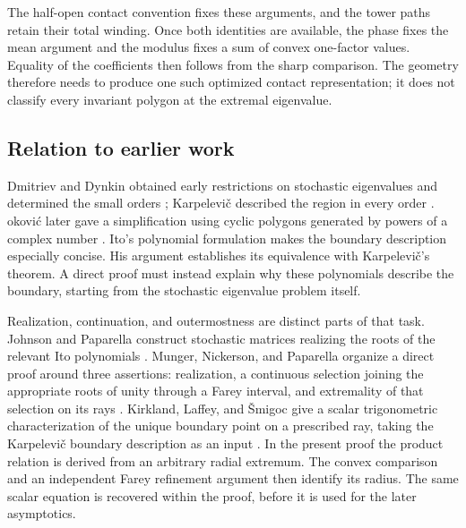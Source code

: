 \documentclass[11pt,a4paper]{article}
\theoremstyle{definition}
\theoremstyle{remark}
\numberwithin{equation}{section}
\begin{document}
The half-open contact convention fixes these arguments, and the tower
paths retain their total winding. Once both identities are available,
the phase fixes the mean argument and the modulus fixes a sum of convex
one-factor values. Equality of the coefficients then follows from the
sharp comparison. The geometry therefore needs to produce one such
optimized contact representation; it does not classify every invariant
polygon at the extremal eigenvalue.

\subsection*{Relation to earlier work}

Dmitriev and Dynkin obtained early restrictions on stochastic eigenvalues and determined the small orders \cite{DD}; Karpelevi\v{c} described the region in every order \cite{Karp}. \DJ okovi\'c later gave a simplification using cyclic polygons generated by powers of a complex number \cite{Djokovic}. Ito's polynomial formulation \cite{Ito} makes the boundary description especially concise. His argument establishes its equivalence with Karpelevi\v{c}'s theorem. A direct proof must instead explain why these polynomials describe the boundary, starting from the stochastic eigenvalue problem itself.

Realization, continuation, and outermostness are distinct parts of that task. Johnson and Paparella construct stochastic matrices realizing the roots of the relevant Ito polynomials \cite[Theorem~3.2]{JP}. Munger, Nickerson, and Paparella organize a direct proof around three assertions: realization, a continuous selection joining the appropriate roots of unity through a Farey interval, and extremality of that selection on its rays \cite[Proposition~1.2]{MNP}. Kirkland, Laffey, and \v{S}migoc give a scalar trigonometric characterization of the unique boundary point on a prescribed ray, taking the Karpelevi\v{c} boundary description as an input \cite[Theorems~1.1 and~1.2]{KirklandLaffeySmigoc}. In the present proof the product relation is derived from an arbitrary radial extremum. The convex comparison and an independent Farey refinement argument then identify its radius. The same scalar equation is recovered within the proof, before it is used for the later asymptotics.
\end{document}
